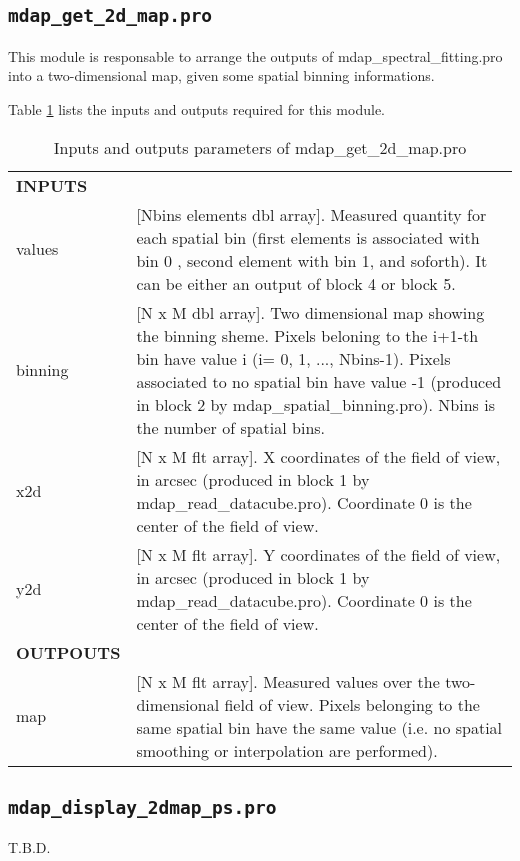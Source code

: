 \documentclass[11pt]{book}
\begin{document}
\subsection{{\tt mdap\_get\_2d\_map.pro}}
\label{dap_sec:mdap_get_2d_map}

This module is responsable to arrange the outputs of
mdap\_spectral\_fitting.pro into a two-dimensional map, given some
spatial binning informations. 

Table \ref{dap_tab:mdap_get_2d_map} lists the inputs and
outputs required for this module.



\begin{center}
\begin{longtable}{p{2.7cm}| p{11.1cm}}
\caption{Inputs and outputs parameters of mdap\_get\_2d\_map.pro} \label{dap_tab:mdap_get_2d_map} \\
\hline
\endfirsthead
\hline
\endhead
\hline
\endlastfoot
\hline
{\bf  INPUTS} &  \\
%
values   &   [Nbins elements dbl array].  Measured quantity for each spatial bin (first elements is associated with bin 0 , 
            second element with bin 1, and soforth). It can be either an output of block 4 or block 5. \\
%
binning  &   [N x M dbl array]. Two dimensional map showing the binning sheme. Pixels beloning to the i+1-th 
                               bin have value i (i= 0, 1, ..., Nbins-1). Pixels associated to no spatial bin
                               have value -1 (produced in block 2 by mdap\_spatial\_binning.pro). Nbins is the number of spatial bins. \\
%
x2d      & [N x M flt array].  X coordinates of the field of view, in arcsec (produced in block 1 by mdap\_read\_datacube.pro). Coordinate 0 is the center of the field of view.\\
%
y2d      & [N x M flt array].  Y coordinates of the field of view, in arcsec (produced in block 1 by mdap\_read\_datacube.pro). Coordinate 0 is the center of the field of view.\\
%
\hline
{\bf OUTPOUTS}        &    \\
%
map      & [N x M flt array].  Measured values over the two-dimensional field of view. Pixels belonging to the same spatial bin 
                               have the same value (i.e. no spatial smoothing or interpolation are performed). \\
\hline
\end{longtable}
\end{center}



\subsection{{\tt mdap\_display\_2dmap\_ps.pro}}
\label{dap_sec:mdap_display_2dmap_ps}
T.B.D.


%
%
	
\end{document}
